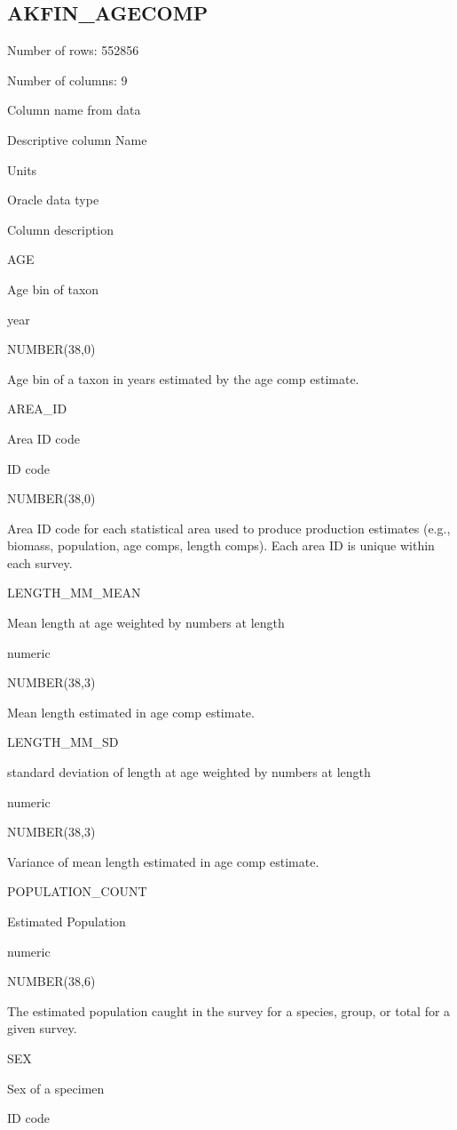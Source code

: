 \documentclass[
  letterpaper,
  oneside,
  open=any]{scrbook}
\begin{document}
\hypertarget{akfin_agecomp}{%
\subsection{AKFIN\_AGECOMP}\label{akfin_agecomp}}

Number of rows: 552856

Number of columns: 9

Column name from data

Descriptive column Name

Units

Oracle data type

Column description

AGE

Age bin of taxon

year

NUMBER(38,0)

Age bin of a taxon in years estimated by the age comp estimate.

AREA\_ID

Area ID code

ID code

NUMBER(38,0)

Area ID code for each statistical area used to produce production
estimates (e.g., biomass, population, age comps, length comps). Each
area ID is unique within each survey.

LENGTH\_MM\_MEAN

Mean length at age weighted by numbers at length

numeric

NUMBER(38,3)

Mean length estimated in age comp estimate.

LENGTH\_MM\_SD

standard deviation of length at age weighted by numbers at length

numeric

NUMBER(38,3)

Variance of mean length estimated in age comp estimate.

POPULATION\_COUNT

Estimated Population

numeric

NUMBER(38,6)

The estimated population caught in the survey for a species, group, or
total for a given survey.

SEX

Sex of a specimen

ID code
\end{document}
